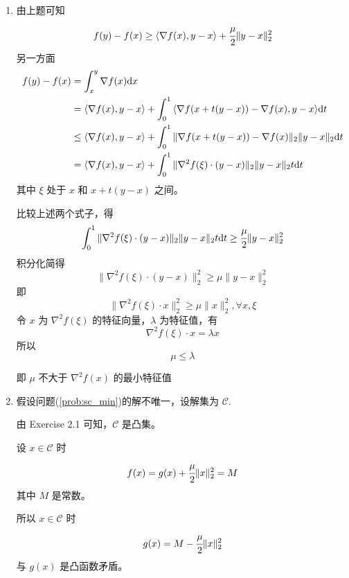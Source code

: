 \documentclass[11pt,letter,notitlepage]{article}
\begin{document}
\begin{solution}
\begin{enumerate}
\begin{enumerate}
              \end{enumerate}
        \item 由上题可知
              $$f(y)-f(x) \ge \langle\nabla f(x),y-x\rangle+\cfrac{\mu}{2}\|y-x\|_2^2$$
              另一方面
              $$\begin{aligned}
                      f(y)-f(x)
                       & = \int_x^y{\nabla f(x){\rm d}x}                                    \\
                       & = \langle\nabla f(x),y-x \rangle
                      +\int_0^1{\langle \nabla f(x+t(y-x))-\nabla f(x),y-x \rangle}{\rm d}t \\
                       & \le \langle\nabla f(x),y-x \rangle
                      +\int_0^1 \| \nabla f(x+t(y-x))-\nabla f(x) \|_2 \|y-x\|_2 {\rm d}t   \\
                       & = \langle\nabla f(x),y-x \rangle
                      +\int_0^1 \| \nabla^2 f(\xi)\cdot(y-x) \|_2 \|y-x\|_2 t{\rm d}t       \\
                  \end{aligned}$$
              其中 $\xi$ 处于 $x$ 和 $x+t(y-x)$ 之间。

              比较上述两个式子，得
              $$\int_0^1 \| \nabla^2 f(\xi)\cdot(y-x) \|_2 \|y-x\|_2 t{\rm d}t
                  \ge \cfrac{\mu}{2}\|y-x\|_2^2$$
              积分化简得
              $$\|\nabla^2 f(\xi)\cdot(y-x)\|_2^2 \ge \mu \|y-x\|_2^2$$
              即
              $$\|\nabla^2 f(\xi)\cdot x\|_2^2 \ge \mu \|x\|_2^2, \forall x, \xi$$
              令 $x$ 为 $\nabla^2 f(\xi)$ 的特征向量，$\lambda$ 为特征值，有
              $$\nabla^2 f(\xi)\cdot x=\lambda x$$
              所以
              $$\mu \le \lambda$$

              即 $\mu$ 不大于 $\nabla^2 f(x)$ 的最小特征值

        \item 假设问题(\ref{prob:sc_min})的解不唯一，设解集为 $\mathcal{C}$.

              由 Exercise 2.1 可知，$\mathcal{C}$ 是凸集。

              设 $x\in\mathcal{C}$ 时
              $$f(x)=g(x)+\cfrac{\mu}{2}\|x\|_2^2=M$$
              其中 $M$ 是常数。

              所以 $x\in\mathcal{C}$ 时
              $$g(x)=M-\cfrac{\mu}{2}\|x\|_2^2$$
              与 $g(x)$ 是凸函数矛盾。


\end{enumerate}
\end{solution}
\end{document}
